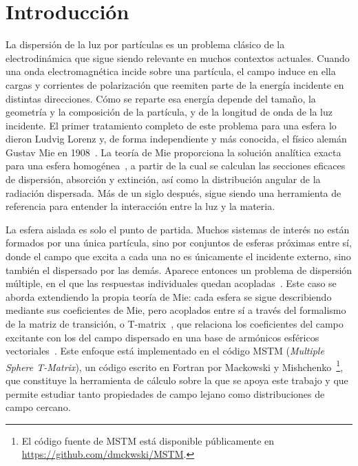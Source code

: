 \section{Introducción}

La dispersión de la luz por partículas es un problema clásico de la
electrodinámica que sigue siendo relevante en muchos contextos actuales. Cuando
una onda electromagnética incide sobre una partícula, el campo induce en ella
cargas y corrientes de polarización que reemiten parte de la energía incidente
en distintas direcciones. Cómo se reparte esa energía depende del tamaño, la
geometría y la composición de la partícula, y de la longitud de onda de la luz
incidente. El primer tratamiento completo de este problema para una esfera lo
dieron Ludvig Lorenz y, de forma independiente y más conocida, el físico alemán
Gustav Mie en 1908~\cite{Mie1908}. La teoría de Mie proporciona la solución
analítica exacta para una esfera homogénea~\cite{Bohren1983,vandeHulst1981}, a
partir de la cual se calculan las secciones eficaces de dispersión, absorción y
extinción, así como la distribución angular de la radiación dispersada. Más de
un siglo después, sigue siendo una herramienta de referencia para entender la
interacción entre la luz y la materia.

La esfera aislada es solo el punto de partida. Muchos sistemas de interés no
están formados por una única partícula, sino por conjuntos de esferas próximas
entre sí, donde el campo que excita a cada una no es únicamente el incidente
externo, sino también el dispersado por las demás. Aparece entonces un problema
de dispersión múltiple, en el que las respuestas individuales quedan
acopladas~\cite{Foldy1945,Lax1951}. Este caso se aborda extendiendo la propia
teoría de Mie: cada esfera se sigue describiendo mediante sus coeficientes de
Mie, pero acoplados entre sí a través del formalismo de la matriz de transición,
o T-matrix~\cite{Waterman1965,Waterman1971}, que relaciona los coeficientes del campo
excitante con los del campo dispersado en una base de armónicos esféricos
vectoriales~\cite{Mackowski1991,Mackowski1996}. 
Este enfoque está implementado en el código MSTM (\textit{Multiple Sphere T-Matrix}), 
un código escrito en Fortran por Mackowski y
Mishchenko~\cite{Mackowski2011,Mackowski_code}\footnote{El código fuente de
MSTM está disponible públicamente en
\url{https://github.com/dmckwski/MSTM}.}, que constituye la herramienta de
cálculo sobre la que se apoya este trabajo y que permite estudiar tanto
propiedades de campo lejano como distribuciones de campo cercano.

